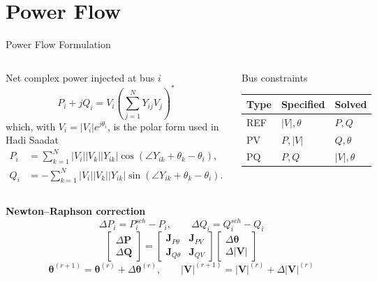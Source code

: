 \documentclass{beamer}
\begin{document}
\section{Power Flow}
\begin{frame}{Power Flow Formulation}
\begin{columns}[t,onlytextwidth]
\scriptsize
Net complex power injected at bus $i$
\[
P_i+jQ_i=V_i\left(\sum_{j=1}^{N}Y_{ij}V_j\right)^{\!*}
\]
which, with $V_i=|V_i|e^{j\theta_i}$, is the polar form used in Hadi Saadat
\begin{align*}
P_i&=\sum_{k=1}^{N}|V_i||V_k||Y_{ik}|\cos(\angle Y_{ik}+\theta_k-\theta_i),\\
Q_i&=-\sum_{k=1}^{N}|V_i||V_k||Y_{ik}|\sin(\angle Y_{ik}+\theta_k-\theta_i).
\end{align*}
\scriptsize
\begin{block}{Bus constraints}
\centering
\setlength{\tabcolsep}{3.5pt}
\begin{tabular}{lll}
\toprule
Type & Specified & Solved \\
\midrule
REF & $|V|,\theta$ & $P,Q$ \\
PV & $P,|V|$ & $Q,\theta$ \\
PQ & $P,Q$ & $|V|,\theta$ \\
\bottomrule
\end{tabular}
\end{block}
\end{columns}
\vspace{0.10cm}
\scriptsize
\textbf{Newton--Raphson correction}
\[
\Delta P_i=P_i^{sch}-P_i,\qquad \Delta Q_i=Q_i^{sch}-Q_i
\]
\[
\boxed{\begin{bmatrix}\Delta\bm P\\\Delta\bm Q\end{bmatrix}
=\begin{bmatrix}\bm J_{P\theta}&\bm J_{PV}\\\bm J_{Q\theta}&\bm J_{QV}\end{bmatrix}
\begin{bmatrix}\Delta\bm\theta\\\Delta|\bm V|\end{bmatrix}}
\]
\[
\bm\theta^{(r+1)}=\bm\theta^{(r)}+\Delta\bm\theta^{(r)},\qquad
|\bm V|^{(r+1)}=|\bm V|^{(r)}+\Delta|\bm V|^{(r)}
\]
\end{frame}
\end{document}
